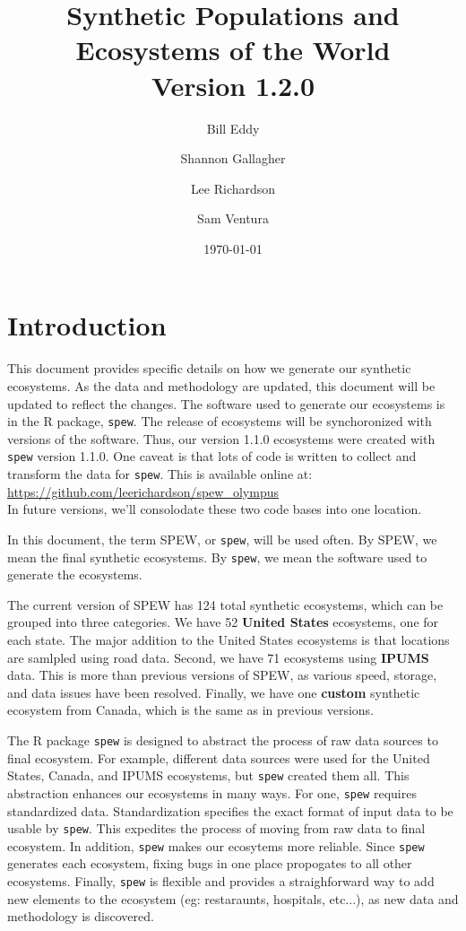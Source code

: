\documentclass{article}
\title{\large{Synthetic Populations and Ecosystems of the World} \\
		Version 1.2.0}
\author{Bill Eddy}
\author{Shannon Gallagher}
\author{Lee Richardson}
\author{Sam Ventura}
\affil[1]{Department of Statistics, Carnegie Mellon University}
\affil[2]{MIDAS Informatics Services Group}
\date{\today}
\begin{document}
\maketitle	

\newpage 

\tableofcontents

\newpage 
\section{Introduction}
	
	This document provides specific details on how we generate our synthetic ecosystems. As the data and methodology are updated, this document will be updated to reflect the changes. The software used to generate our ecosystems is in the R package, \verb|spew|. The release of ecosystems will be synchoronized with versions of the software. Thus, our version 1.1.0 ecosystems were created with \verb|spew| version 1.1.0. One caveat is that lots of code is written to collect and transform the data for \verb|spew|. This is available online at: \\

		\url{https://github.com/leerichardson/spew_olympus} \\

	In future versions, we'll consolodate these two code bases into one location. 
	\vspace{1mm}

	In this document, the term SPEW, or \verb|spew|, will be used often. By SPEW, we mean the final synthetic ecosystems. By \verb|spew|, we mean the software used to generate the ecosystems. 

	The current version of SPEW has 124 total synthetic ecosystems, which can be grouped into three categories. We have 52 \textbf{United States} ecosystems, one for each state. The major addition to the United States ecosystems is that locations are samlpled using road data. Second, we have 71 ecosystems using \textbf{IPUMS} data. This is more than previous versions of SPEW, as various speed, storage, and data issues have been resolved. Finally, we have one \textbf{custom} synthetic ecosystem from Canada, which is the same as in previous versions.

	The R package \verb|spew| is designed to abstract the process of raw data sources to final ecosystem. For example, different data sources were used for the United States, Canada, and IPUMS ecosystems, but \verb|spew| created them all. This abstraction enhances our ecosystems in many ways. For one, \verb|spew| requires standardized data. Standardization specifies the exact format of input data to be usable by \verb|spew|. This expedites the process of moving from raw data to final ecosystem. In addition, \verb|spew| makes our ecosytems more reliable. Since \verb|spew| generates each ecosystem, fixing bugs in one place propogates to all other ecosystems. Finally, \verb|spew| is flexible and provides a straighforward way to add new elements to the ecosystem (eg: restaraunts, hospitals, etc...), as new data and methodology is discovered.  
\end{document}
